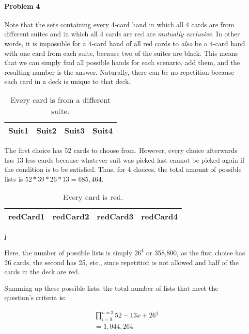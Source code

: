 \documentclass{article}
\newcommand{\fallingfactorial}[1]{%
  ^{\underline{#1}}%
}
\begin{document}
	\paragraph{Problem 4}
	
	Note that the sets containing every 4-card hand in which all 4 cards are from different suites and 
	in which all 4 cards are red are \textit{mutually exclusive}. In other words, it is impossible for 
	a 4-card hand of all red cards to \textit{also} be a 4-card hand with one card from each suite, 
	because two of the suites are black. This means that we can simply find all possible hands for each
	scenario, add them, and the resulting number is the answer. Naturally, there can be no repetition because
	each card in a deck is unique to that deck.
	
	\begin{table} [h!]
	\centering
		\begin{tabular} { | c | c | c | c | }
		\hline
		Suit1 & Suit2 & Suit3 & Suit4 \\ 
		\hline
		\end{tabular}
		\caption{Every card is from a different suite.}
	\end{table}
	
	The first choice has 52 cards to choose from. However, every choice afterwards has 13 less cards because
	whatever suit was picked last cannot be picked again if the condition is to be satisfied. Thus, for 4 choices, 
	the total amount of possible lists is $52*39*26*13 = 685,464$.
	
	\begin{table} [h!]
	\centering
		\begin{tabular} { | c | c | c | c | }
		\hline
		redCard1 & redCard2 & redCard3 & redCard4 \\ 
		\hline
		\end{tabular}j
		\caption{Every card is red.}
	\end{table}
	
	Here, the number of possible lists is simply $26\fallingfactorial{4}$ or 358,800, as the first choice 
	has 26 cards, the second has 25, etc., since repetition is not allowed and half of the cards 
	in the deck are red. 
	
	Summing up these possible lists, the total number of lists that meet the question's criteria is:
	
	\begin{align}
	\prod_{i=0}^{n = 3} 52 - 13x + 26\fallingfactorial{4}\\
	= 1,044,264
	\end{align}
\end{document}
